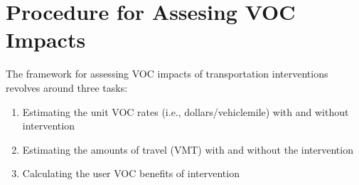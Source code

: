 \section{Procedure for Assesing VOC Impacts}
The framework for assessing VOC impacts of transportation interventions revolves around three tasks:
\begin{enumerate}
	\item Estimating the unit VOC rates (i.e., dollars/vehiclemile) with and without intervention
	\item Estimating the amounts of travel (VMT) with and without the intervention
	\item Calculating the user VOC benefits of intervention
\end{enumerate}